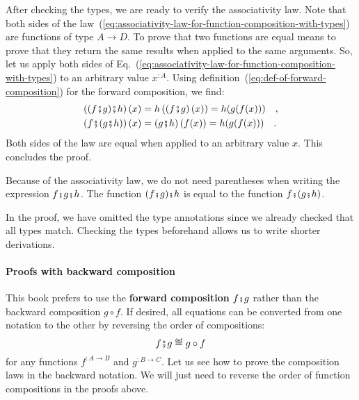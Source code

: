 After checking the types, we are ready to verify the associativity
law. Note that both sides of the law~(\ref{eq:associativity-law-for-function-composition-with-types})
are functions of type $A\rightarrow D$. To prove that two functions
are equal means to prove that they return the same results when applied
to the same arguments. So, let us apply both sides of Eq.~(\ref{eq:associativity-law-for-function-composition-with-types})
to an arbitrary value $x^{:A}$. Using definition~(\ref{eq:def-of-forward-composition})
for the forward composition, we find:
\begin{align*}
\left((f\bef g)\bef h\right)(x) & =h\left(\left(f\bef g\right)(x)\right)=h(g(f(x)))\quad,\\
\left(f\bef(g\bef h)\right)(x) & =\left(g\bef h\right)(f(x))=h(g(f(x)))\quad.
\end{align*}
Both sides of the law are equal when applied to an arbitrary value
$x$. This concludes the proof.

Because of the associativity law, we do not need parentheses when
writing the expression $f\bef g\bef h$. The function $(f\bef g)\bef h$
is equal to the function $f\bef(g\bef h)$.

In the proof, we have omitted the type annotations since we already
checked that all types match. Checking the types beforehand allows
us to write shorter derivations.

\paragraph{Proofs with backward composition}

This book prefers to use the \textbf{forward composition}
$f\bef g$ rather than the backward composition
$g\circ f$. If desired, all equations can be converted from one notation
to the other by reversing the order of compositions:
\[
f\bef g\triangleq g\circ f
\]
for any functions $f^{:A\rightarrow B}$ and $g^{:B\rightarrow C}$.
Let us see how to prove the composition laws in the backward notation.
We will just need to reverse the order of function compositions in
the proofs above.

